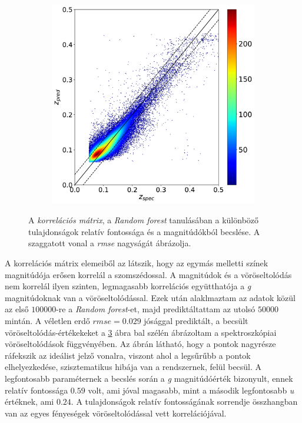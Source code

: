 \documentclass[12pt,letterpaper,oneside,openright]{book}
\begin{document}
\begin{figure}[]
\begin{subfigure}[b]{0.32\textwidth}
    \label{fig:2}
  \end{subfigure}
  \hspace{0cm}
  \begin{subfigure}[b]{0.32\textwidth}
    \includegraphics[width=\textwidth, height = 0.95\textwidth]{Figures/plotbaselineRF.png}
    \label{fig:2}
  \end{subfigure}
  \caption{A \textit{korrelációs mátrix}, a \textit{Random forest} tanulásában a különböző tulajdonságok relatív fontossága és a magnitúdókból becslése. A szaggatott vonal a \textit{rmse} nagyságát ábrázolja.}
  \label{fig:dist2}
 \end{figure}
A korrelációs mátrix elemeiből az látszik, hogy az egymás melletti színek magnitúdója erősen korrelál a szomszédossal. A magnitúdok és a vöröseltolódás nem korrelál ilyen szinten, legmagasabb korrelációs együtthatója a \textit{g} magnitúdoknak van a vöröseltolódással. Ezek után alaklmaztam az adatok közül az első $\num{100000}$-re a \textit{Random forest}-et, majd prediktáltattam az utolsó $\num{50000}$ mintán. A véletlen erdő $rmse =0.029$ jósággal prediktált, a becsült vöröseltolódás-értékekeket a \ref{fig:dist2} ábra bal szélén ábrázoltam a spektroszkópiai vöröseltolódások függvényében. Az ábrán látható, hogy a pontok nagyrésze ráfekszik az ideálist jelző vonalra, viszont ahol a legsűrűbb a pontok elhelyezkedése, szisztematikus hibája van a rendszernek, felül becsül. A legfontosabb paraméternek a becslés során a \textit{g} magnitúdóérték bizonyult, ennek relatív fontossága $0.59$ volt, ami jóval magasabb, mint a második legfontosabb \textit{u} értéknek, ami $0.24$. A tulajdonságok relatív fontosságának sorrendje összhangban van az egyes fényeségek vöröseltolódással vett korrelációjával.
\end{document}
